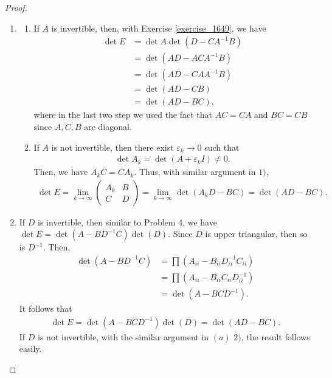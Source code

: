\documentclass[10pt]{book}
\theoremstyle{definition}
\numberwithin{equation}{chapter}
\begin{document}
\begin{proof}
~\begin{enumerate}[label=(\alph*)]
    \item
    \begin{enumerate}[label=\arabic*)]
        \item If $A$ is invertible, then, with Exercise \ref{exercise_1649}, we have 
        \begin{align*}
            \det E & = \det A \det \left( D - C A^{-1} B\right) \\
            & = \det \left(AD - A C A^{-1} B\right) \\
            & = \det \left(AD - C A A^{-1} B\right) \\
            & = \det \left(AD - CB\right)\\
            & = \det \left(AD - BC\right),
        \end{align*}
        where in the last two step we used the fact that $AC = CA$ and $BC = CB$ since $A,C,B$ are diagonal.
        \item If $A$ is not invertible, then there exist $\varepsilon_k \to 0$ such that 
        \begin{align*}
            \det A_k = \det (A + \varepsilon_k I) \neq 0.
        \end{align*}
        Then, we have $A_k C = CA_k$. Thus, with similar argument in $1)$, 
        \begin{align*}
            \det E = \lim_{k\to \infty} \begin{pmatrix}
            A_k & B \\
            C & D
        \end{pmatrix} = \lim_{k\to\infty} \det \left(A_k D - BC\right) = \det \left(AD - BC\right).
        \end{align*}
    \end{enumerate}
    
    \item If $D$ is invertible, then similar to Problem 4, we have $\det E = \det (A-BD^{-1}C)\det(D)$. Since $D$ is upper triangular, then so is $D^{-1}$. Then, 
    \begin{align*}
        \det (A-BD^{-1}C) & = \prod \left(A_{ii} - B_{ii} D^{-1}_{ii} C_{ii}\right) \\
        & = \prod \left(A_{ii} - B_{ii} C_{ii} D^{-1}_{ii} \right) \\
        & = \det (A-BCD^{-1}).
    \end{align*}
    It follows that
    \begin{align*}
        \det E = \det (A-BCD^{-1})\det(D) = \det (AD - BC).
    \end{align*}
    If $D$ is not invertible, with the similar argument in $(a)\,\,2)$, the result follows easily.
    

\end{enumerate}
\end{proof}
\end{document}
